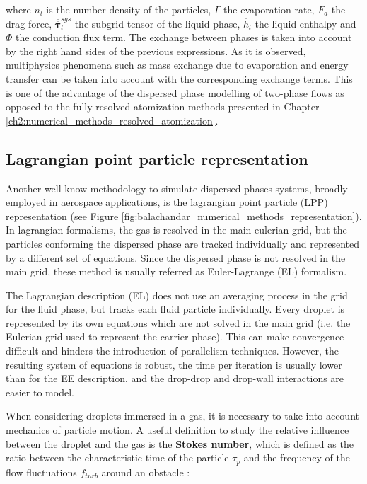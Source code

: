 where $n_l$ is the number density of the particles, $\Gamma$ the evaporation rate, $F_{d}$ the drag force, $\overline{\overline{\pmb{\tau}}}_l^{sgs}$ the subgrid tensor of the liquid phase, $\overline{h}_l$ the liquid enthalpy and $\overline{\Phi}$ the conduction flux term. The exchange between phases is taken into account by the right hand sides of the previous expressions. As it is observed, multiphysics phenomena such as mass exchange due to evaporation and energy transfer can be taken into account with the corresponding exchange terms.  This is one of the advantage of the dispersed phase modelling of two-phase flows as opposed to the fully-resolved atomization methods presented in Chapter \ref{ch2:numerical_methods_resolved_atomization}. 

\subsection{Lagrangian point particle representation}
\label{sec:ch3_EL_formalisms}

Another well-know methodology to simulate dispersed phases systems, broadly employed in aerospace applications, is the lagrangian point particle (LPP) representation (see Figure \ref{fig:balachandar_numerical_methods_representation}). In lagrangian formalisms, the gas is resolved in the main eulerian grid, but the particles conforming the dispersed phase are tracked individually and represented by a different set of equations. Since the dispersed phase is not resolved in the main grid, these method is usually referred as Euler-Lagrange (EL) formalism.


The Lagrangian description (EL) does not use an averaging process in the grid for the fluid phase, but tracks each fluid particle individually. Every droplet is represented by its own equations which are not solved in the main grid (i.e. the Eulerian grid used to represent the carrier phase). This can make convergence difficult and hinders the introduction of parallelism techniques. However, the resulting system of equations is robust, the time per iteration is usually lower than for the EE description, and the drop-drop and drop-wall interactions are easier to model.

When considering droplets immersed in a gas, it is necessary to take into account mechanics of particle motion. A useful definition to study the relative influence between the droplet and the gas is the \textbf{Stokes number}, which is defined as the ratio between the characteristic time of the particle $\tau_p$ and the frequency of the flow fluctuations $f_{turb}$ around an obstacle :

